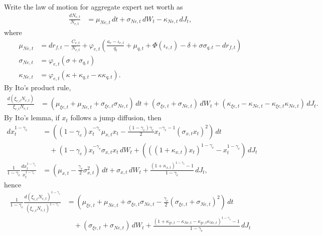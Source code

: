 \documentclass[12 pt, oneside]{article}
\theoremstyle{definition}
\theoremstyle{definition}
\theoremstyle{definition}
\begin{document}
Write the law of motion for aggregate expert net worth as
\begin{align}
\label{eq:net worth law of motion}
  \frac{dN_{e, t}}{N_{e, t}} & = \mu_{Ne, t}\, dt + \sigma_{Ne, t}\, dW_t - \kappa_{Ne, t}\, dJ_t,
\end{align}
where
\begin{align}\label{eq:unsimp drift net worth}
  \mu_{Ne, t} & = dr_{f,t} - \frac{C_{e, t}}{N_{e, t}} + \varphi_{e, t}\left(\frac{a_e - \iota_{e, t}}{q_t} + \mu_{q, t} + \Phi(\iota_{e, t}) - \delta + \sigma\sigma_{q, t} - dr_{f, t}\right)\\
  \sigma_{Ne, t} & = \varphi_{e, t}(\sigma + \sigma_{q, t})\\
  \kappa_{Ne, t} & = \varphi_{e, t}(\kappa + \kappa_{q, t} - \kappa\kappa_{q, t}).
\end{align}
By Ito's product rule,
\begin{align*}
  \frac{d(\xi_{e, t} N_{e, t})}{\xi_{e, t}N_{e, t}} & = (\mu_{\xi e, t} + \mu_{Ne, t} + \sigma_{\xi e, t} \sigma_{Ne, t})\,dt + (\sigma_{\xi e, t} + \sigma_{Ne, t})\, dW_t + (\kappa_{\xi e, t} - \kappa_{Ne, t} - \kappa_{\xi e, t}\kappa_{Ne, t})\, dJ_t.
\end{align*}
By Ito's lemma, if $x_t$ follows a jump diffusion, then
\begin{align*}
dx_t^{1 - \gamma_e} & = \left((1 - \gamma_e) x_t^{ - \gamma_e}\mu_{x, t}x_t - \frac{(1 - \gamma_e)\gamma_e}{2} x_t^{-\gamma_e - 1}(\sigma_{x, t}x_t)^2\right)\, dt\\
                    &\quad + (1 - \gamma_e)x_t^{- \gamma_e}\sigma_{x, t}x_t\, dW_t  + (((1 + \kappa_{x, t})x_t)^{1 - \gamma_e} - x_t^{1 - \gamma_e})\, dJ_t\\
\frac{1}{1 - \gamma_e}\frac{dx_t^{1 - \gamma_e}}{x_t^{1 - \gamma_e}} & = (\mu_{x, t} - \frac{\gamma_e}{2} \sigma_{x, t}^2)\, dt + \sigma_{x, t}\, dW_t + \frac{(1 + \kappa_{x, t})^{1 - \gamma_e} - 1}{1 - \gamma_e}\, dJ_t,
\end{align*}
hence
\begin{align*}
  \frac{1}{1 - \gamma_e}\frac{d(\xi_{e, t}N_{e, t})^{1- \gamma_e}}{(\xi_{e, t}N_{e, t})^{1 - \gamma_e}} & = \left(\mu_{\xi e, t} + \mu_{Ne, t} + \sigma_{\xi e, t} \sigma_{Ne, t} - \frac{\gamma_e}{2} (\sigma_{\xi e, t} + \sigma_{Ne, t})^2 \right)\, dt\\
                                                                                                    &\quad + (\sigma_{\xi e, t} + \sigma_{Ne, t})\, dW_t + \frac{(1 + \kappa_{\xi e, t} - \kappa_{Ne, t} - \kappa_{\xi e, t}\kappa_{Ne, t})^{1 - \gamma_e} - 1}{1 - \gamma_e}\, dJ_t
\end{align*}
\end{document}
